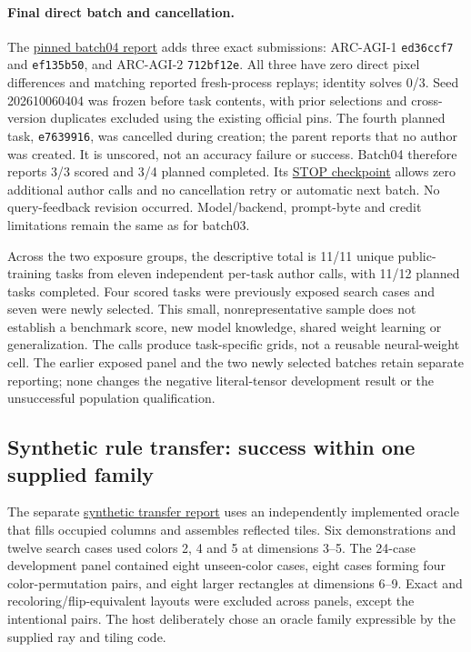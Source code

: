 \documentclass[11pt]{article}
\begin{document}
\paragraph{Final direct batch and cancellation.}
The \href{https://github.com/Sanokei/CellForge/blob/02beaf18251fca5ed1f1eb55e92f00a3e3820e88/reports/NATIVE_DIRECT_BATCH04_RESULT_20261006.md}{pinned batch04 report}
adds three exact submissions: ARC-AGI-1 \texttt{ed36ccf7} and \texttt{ef135b50}, and
ARC-AGI-2 \texttt{712bf12e}. All three have zero direct pixel differences and matching
reported fresh-process replays; identity solves 0/3. Seed 202610060404 was frozen before
task contents, with prior selections and cross-version duplicates excluded using the existing
official pins. The fourth planned task, \texttt{e7639916}, was cancelled during creation;
the parent reports that no author was created. It is unscored, not an accuracy failure or
success. Batch04 therefore reports 3/3 scored and 3/4 planned completed.
Its \href{https://github.com/Sanokei/CellForge/blob/02beaf18251fca5ed1f1eb55e92f00a3e3820e88/runs/weights-native-arc-direct-batch04-20261006/CHECKPOINT_STOP.json}{STOP checkpoint}
allows zero additional author calls and no cancellation retry or automatic next batch.
No query-feedback revision occurred. Model/backend, prompt-byte and credit limitations
remain the same as for batch03.

Across the two exposure groups, the descriptive total is 11/11 unique public-training tasks
from eleven independent per-task author calls, with 11/12 planned tasks completed.
Four scored tasks were previously exposed search cases and seven were newly selected. This small, nonrepresentative sample does not
establish a benchmark score, new model knowledge, shared weight learning or generalization.
The calls produce task-specific grids, not a reusable neural-weight cell. The earlier exposed
panel and the two newly selected batches retain separate reporting; none changes the negative
literal-tensor development result or the unsuccessful population qualification.

\subsection{Synthetic rule transfer: success within one supplied family}
The separate \href{https://github.com/Sanokei/CellForge/blob/02beaf18251fca5ed1f1eb55e92f00a3e3820e88/reports/NATIVE_TRANSFER_CURRICULUM_RESULT_20261006.md}{synthetic transfer report}
uses an independently implemented oracle that fills occupied columns and assembles reflected
tiles. Six demonstrations and twelve search cases used colors 2, 4 and 5 at dimensions 3--5.
The 24-case development panel contained eight unseen-color cases, eight cases forming four
color-permutation pairs, and eight larger rectangles at dimensions 6--9. Exact and
recoloring/flip-equivalent layouts were excluded across panels, except the intentional pairs.
The host deliberately chose an oracle family expressible by the supplied ray and tiling code.
\end{document}

